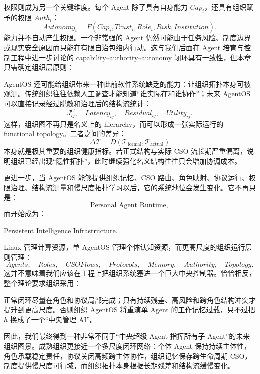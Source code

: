权限则成为另一个关键维度。每个 Agent 除了具有自身能力 $Cap_i$，还具有组织赋予的权限 $Auth_i$：
\[
Autonomy_i
=
F(
Cap_i,
Trust_i,
Role_i,
Risk,
Institution
).
\]
能力并不自动产生权限。一个非常强的 Agent 仍然可能由于任务风险、制度边界或现实安全原因而只能在有限自治包络内行动。这与我们后面在 Agent 培育与控制工程中进一步讨论的 capability--authority--autonomy 闭环具有一致性，但本章只需确定组织层原则：
\begin{statementbox}
\centering
{}
\end{statementbox}

AgentOS 还可能给组织带来一种此前软件系统缺乏的能力：让组织拓扑本身可被观测。传统组织往往依赖人工调查才能知道“谁实际在和谁协作”；未来 AgentOS 可以直接记录经过脱敏和治理后的结构流统计：
\[
J^{C}_{ij},
\quad
Latency_{ij},
\quad
Residual_{ij},
\quad
Utility_{ij}.
\]
这样，组织图不再只是名义上的 hierarchy，而可以形成一张实际运行的 functional topology。二者之间的差异：
\[
\Delta\mathcal T
=
D(
\mathcal T_{\mathrm{formal}},
\mathcal T_{\mathrm{actual}}
)
\]
本身就是极其重要的组织健康指标。若正式结构与实际 CSO 流长期严重偏离，说明组织已经出现“隐性拓扑”，此时继续强化名义结构往往只会增加协调成本。

更进一步，当 AgentOS 能够提供组织记忆、CSO 路由、角色映射、协议运行、权限治理、结构流测量和慢尺度拓扑学习以后，它的系统地位会发生变化。它不再只是：
\[
\text{Personal Agent Runtime},
\]
而开始成为：
\begin{statementbox}
Persistent Intelligence Infrastructure.
\end{statementbox}
Linux 管理计算资源，单 AgentOS 管理个体认知资源，而更高尺度的组织运行层则管理：
\[
Agents,\quad
Roles,\quad
CSOFlows,\quad
Protocols,\quad
Memory,\quad
Authority,\quad
Topology.
\]
这并不意味着我们应该在工程上把组织系统塞进一个巨大中央控制器。恰恰相反，整个理论要求组织采用：
\begin{statementbox}
\centering
{}
\end{statementbox}
正常闭环尽量在角色和协议局部完成；只有持续残差、高风险和跨角色结构冲突才提升到更高尺度。否则组织 AgentOS 将重演单 Agent 的工作记忆过载，只不过把 $h$ 换成了一个“中央管理 AI”。

因此，我们最终得到一种非常不同于“中央超级 Agent 指挥所有子 Agent”的未来组织图景。成熟组织更接近一个多尺度闭环网络：个体 Agent 保持持续主体性，角色承载稳定责任，协议关闭高频跨主体协作，组织记忆保存跨生命周期 CSO，制度提供慢尺度可行域，而组织拓扑本身根据长期残差和结构流缓慢变化。

